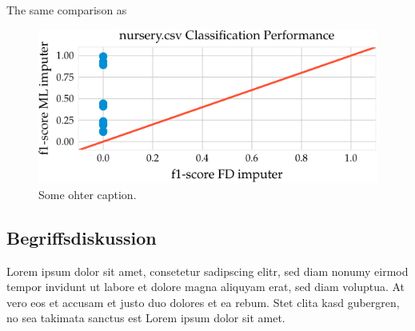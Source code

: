 The same comparison as
 \begin{figure}[h]
     \centering
     \includegraphics[width=.8\textwidth]{../figures/nursery/f1_ml_fd_nursery}
     \caption{Some ohter caption.}
     \label{fig:f1_ml_fd_nursery}
\end{figure}

\subsection{Begriffsdiskussion}
Lorem ipsum dolor sit amet, consetetur sadipscing elitr, sed diam nonumy eirmod
tempor invidunt ut labore et dolore magna aliquyam erat, sed diam voluptua. At
vero eos et accusam et justo duo dolores et ea rebum. Stet clita kasd gubergren,
no sea takimata sanctus est Lorem ipsum dolor sit amet.
